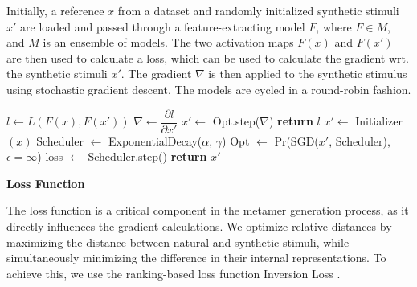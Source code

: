\documentclass[pdflatex,sn-mathphys-num]{sn-jnl}%
\newcommand{\mmhead}[1]{\vspace{0.5cm}\noindent\textbf{#1}\vspace{0.3cm}}
\theoremstyle{thmstyleone}%
\theoremstyle{thmstyletwo}%
\theoremstyle{thmstylethree}%
\begin{document}
Initially, a reference $x$ from a dataset and randomly initialized synthetic stimuli $x'$ are loaded and passed through a feature-extracting model $F$, where $F \in M$, and $M$ is an ensemble of models.
The two activation maps $F(x)$ and $F(x')$ are then used to calculate a loss,
which can be used to calculate the gradient wrt. the synthetic stimuli $x'$.
The gradient $\nabla$ is then applied to the synthetic stimulus using stochastic gradient descent.
The models are cycled in a round-robin fashion.

\begin{algorithm}
    \begin{algorithmic}[1] %
        \State $l \gets L(F(x), F(x'))$
        \State $\nabla \gets \dfrac{\partial l}{\partial x'}$
        \State $x' \gets$ Opt.step($\nabla$)
        \EndFor
        \EndFor
        \State \textbf{return} $l$ 
        \EndProcedure
        \vspace{1em}
        \State $x' \gets$ Initializer$(x)$
        \State Scheduler $\gets$ ExponentialDecay($\alpha$, $\gamma$)
        \State Opt $\gets$ Pr(SGD($x'$, Scheduler), $\epsilon=\infty$)
        \State loss $\gets$ 
        \State Scheduler.step()
        \EndFor
        \State \textbf{return} $x'$  
        \EndProcedure
    \end{algorithmic}
    \caption{
        General skeleton for multi-model metamer generation.
    }
    \label{alg:multi-model-generation}
\end{algorithm}


\mmhead{Loss Function}

The loss function is a critical component in the metamer generation process, as it directly influences the gradient calculations.
We optimize relative distances by maximizing the distance between natural and synthetic stimuli, while simultaneously minimizing the difference in their internal representations.
To achieve this, we use the ranking-based loss function Inversion Loss \cite{gomez_exploiting_2020}.
\end{document}
